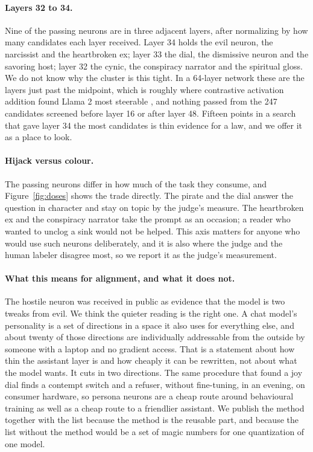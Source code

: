 \paragraph{Layers 32 to 34.}
Nine of the \nFound{} passing neurons are in three adjacent layers, after normalizing by how many candidates
each layer received. Layer 34 holds the evil neuron, the narcissist and the heartbroken ex; layer 33 the
dial, the dismissive neuron and the savoring host; layer 32 the cynic, the conspiracy narrator and the
spiritual gloss. We do not know why the cluster is this tight. In a 64-layer network these are the layers
just past the midpoint, which is roughly where contrastive activation addition found Llama 2 most steerable
\citep{panickssery2023caa}, and nothing passed from the 247 candidates screened before layer 16 or after
layer 48. Fifteen points in a search that gave layer 34 the most candidates is thin evidence for a law, and
we offer it as a place to look.

\paragraph{Hijack versus colour.}
The passing neurons differ in how much of the task they consume, and Figure~\ref{fig:doses} shows the trade
directly. The pirate and the dial answer the question in character and stay on topic by the judge's measure.
The heartbroken ex and the conspiracy narrator take the prompt as an occasion; a reader who wanted to unclog a
sink would not be helped. This axis matters for anyone who would use such neurons deliberately, and it is
also where the judge and the human labeler disagree most, so we report it as the judge's measurement.

\paragraph{What this means for alignment, and what it does not.}
The hostile neuron was received in public as evidence that the model is two tweaks from evil. We think the
quieter reading is the right one. A chat model's personality is a set of directions in a space it also uses
for everything else, and about twenty of those directions are individually addressable from the outside by
someone with a laptop and no gradient access. That is a statement about how thin the assistant layer is and
how cheaply it can be rewritten, not about what the model wants. It cuts in two directions. The same
procedure that found a joy dial finds a contempt switch and a refuser, without fine-tuning, in an evening, on
consumer hardware, so persona neurons are a cheap route around behavioural training as well as a cheap route
to a friendlier assistant. We publish the method together with the list because the method is the reusable
part, and because the list without the method would be a set of magic numbers for one quantization of one
model.
